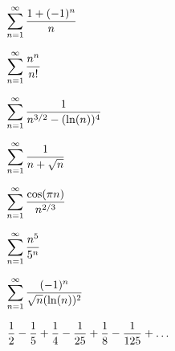 \documentclass{ximera}
\newcommand{\dsum}{\displaystyle \sum}
\newcommand{\dsumone}{\dsum_{n=1}^{\infty}}
\begin{document}
\begin{problem}$\dsumone \df{1+(-1)^n}{n}$
\begin{multipleChoice}
\end{multipleChoice}
\end{problem}
\begin{problem} $\dsumone \df{n^n}{n!}$
\begin{multipleChoice}
\end{multipleChoice}
	\end{problem}
\begin{problem} $\dsumone \df{1}{n^{3/2} - (\ln(n))^4}$
\begin{multipleChoice}
\end{multipleChoice}
\end{problem}
\begin{problem} $\dsumone \df{1}{n+\sqrt{n}}$
\begin{multipleChoice}
\end{multipleChoice}
\end{problem}
\begin{problem} $\dsumone \df{\cos(\pi n)}{n^{2/3}}$
\begin{multipleChoice}
\end{multipleChoice}
\end{problem}
\begin{problem} $\dsumone \df{n^5}{5^n}$
\begin{multipleChoice}
\end{multipleChoice}
\end{problem}
\begin{problem} $\dsumone \df{(-1)^{n}}{\sqrt{n}(\ln(n))^2}$
\begin{multipleChoice}
\end{multipleChoice}
\end{problem}
\begin{problem} $\displaystyle\frac{1}{2} - \displaystyle\frac{1}{5} + \displaystyle\frac{1}{4} - \displaystyle\frac{1}{25} + \displaystyle\frac{1}{8} - \displaystyle\frac{1}{125} + \dots$
\begin{multipleChoice}
\end{multipleChoice}
\end{problem}
\end{document}
